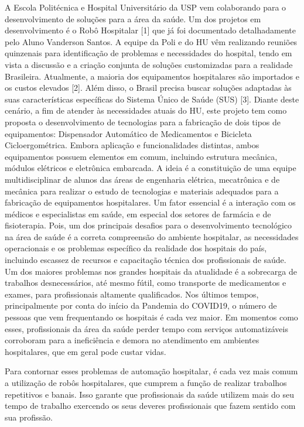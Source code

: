 \documentclass[../delivery_hospital_report.tex]{subfiles}
\begin{document}
A Escola Politécnica e Hospital Universitário da USP vem colaborando para o desenvolvimento de soluções para a área da
saúde. Um dos projetos em desenvolvimento é o Robô Hospitalar [1] que já foi documentado detalhadamente pelo Aluno Vanderson Santos. A equipe da Poli
e do HU vêm realizando reuniões quinzenais para identificação de problemas e
necessidades do hospital, tendo em vista a discussão e a criação conjunta de soluções
customizadas para a realidade Brasileira. Atualmente, a maioria dos equipamentos hospitalares são
importados e os custos elevados [2]. Além disso, o Brasil precisa buscar soluções
adaptadas às suas características específicas do Sistema Único de Saúde (SUS) [3].
Diante deste cenário, a fim de atender às necessidades atuais do HU, este projeto tem
como proposta o desenvolvimento de tecnologias para a fabricação de dois tipos de
equipamentos: Dispensador Automático de Medicamentos e Bicicleta
Cicloergométrica. Embora aplicação e funcionalidades distintas, ambos equipamentos
possuem elementos em comum, incluindo estrutura mecânica, módulos elétricos e
eletrônica embarcada. A ideia é a constituição de uma equipe multidisciplinar de
alunos das áreas de engenharia elétrica, mecatrônica e de mecânica para realizar o
estudo de tecnologias e materiais adequados para a fabricação de equipamentos
hospitalares. Um fator essencial é a interação com os médicos e especialistas em
saúde, em especial dos setores de farmácia e de fisioterapia. Pois, um dos principais
desafios para o desenvolvimento tecnológico na área de saúde é a correta
compreensão do ambiente hospitalar, as necessidades operacionais e os problemas
específico da realidade dos hospitais do país, incluindo escassez de recursos e
capacitação técnica dos profissionais de saúde.
Um dos maiores problemas nos grandes hospitais da atualidade é a sobrecarga de trabalhos desnecessários, até mesmo fútil, como transporte de medicamentos e exames, para profissionais altamente qualificados. Nos últimos tempos, principalmente por conta do início da Pandemia do COVID19, o número de pessoas que vem frequentando os hospitais é cada vez maior. Em momentos como esses, profissionais da área da saúde perder tempo com serviços automatizáveis corroboram para a ineficiência e demora no atendimento em ambientes hospitalares, que em geral pode custar vidas.

Para contornar esses problemas de automação hospitalar, é cada vez mais comum a utilização de robôs hospitalares, que cumprem a função de realizar trabalhos repetitivos e banais. Isso garante que profissionais da saúde utilizem mais do seu tempo de trabalho exercendo os seus deveres profissionais que fazem sentido com sua profissão. 
\end{document}
